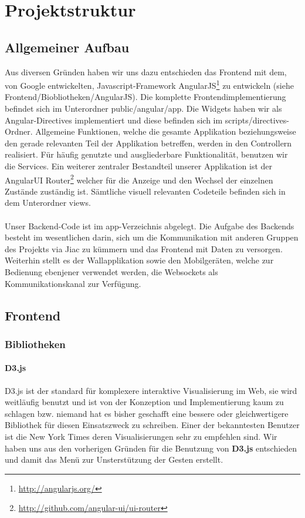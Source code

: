 \documentclass[10pt,a4paper]{report}
\newcommand{\code}[1]{{\fontfamily{cmvtt}\selectfont #1}}
\begin{document}
	\section{Projektstruktur}
		\subsection{Allgemeiner Aufbau}
			Aus diversen Gründen haben wir uns dazu entschieden das Frontend mit dem, von Google entwickelten, Javascript-Framework AngularJS\footnote{\href{http://angularjs.org/}{http://angularjs.org/}} zu entwickeln (siehe Frontend/Biobliotheken/AngularJS). Die komplette Frontendimplementierung befindet sich im Unterordner \code{public/angular/app}. Die Widgets haben wir als Angular-Directives implementiert und diese befinden sich im \code{scripts/directives}-Ordner. Allgemeine Funktionen, welche die gesamte Applikation beziehungsweise den gerade relevanten Teil der Applikation betreffen, werden in den Controllern realisiert. Für häufig genutzte und ausgliederbare Funktionalität, benutzen wir die Services. Ein weiterer zentraler Bestandteil unserer Applikation ist der AngularUI Router\footnote{\href{http://github.com/angular-ui/ui-router}{http://github.com/angular-ui/ui-router}} welcher für die Anzeige und den Wechsel der einzelnen Zustände zuständig ist. Sämtliche visuell relevanten Codeteile befinden sich in dem Unterordner \code{views}.\\\\
			Unser Backend-Code ist im \code{app}-Verzeichnis abgelegt. Die Aufgabe des Backends  besteht im wesentlichen darin, sich um die Kommunikation mit anderen Gruppen des Projekts via Jiac zu kümmern und das Frontend mit Daten zu versorgen. Weiterhin stellt es der Wallapplikation sowie den Mobilgeräten, welche zur Bedienung ebenjener verwendet werden, die Websockets als Kommunikationskanal zur Verfügung.

		\subsection{Frontend}
			\subsubsection{Bibliotheken}
				\paragraph{D3.js}
					D3.js ist der standard für komplexere interaktive Visualisierung im Web, sie wird weitläufig benutzt und ist von der Konzeption und Implementierung kaum zu schlagen bzw. niemand hat es bisher geschafft eine bessere oder gleichwertigere Bibliothek für diesen Einsatszweck zu schreiben. Einer der bekanntesten Benutzer ist die New York Times deren Visualisierungen sehr zu empfehlen sind.
					Wir haben uns aus den vorherigen Gründen für die Benutzung von \textbf{D3.js} entschieden und damit das Menü zur Unsterstützung der Gesten erstellt.
\end{document}
